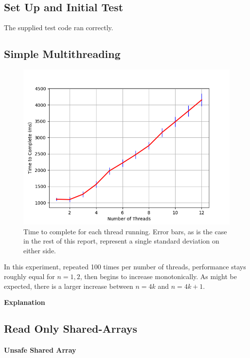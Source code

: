 \documentclass[11pt]{article}
\newcommand{\todo}[1]{\textbf{#1}}
\begin{document}
\subsection{Set Up and Initial Test}
The supplied test code ran correctly.
\subsection{Simple Multithreading}
\begin{figure}\label{step2_1}
\centering
\includegraphics[scale=0.65]{step2.png}
 \caption{Time to complete for each thread running. Error bars, as is the case in the rest of this report, represent a single standard deviation on either side.}
\end{figure}

In this experiment, repeated 100 times per number of threads, performance stays roughly equal for $n = 1, 2$, then begins to increase monotonically. As might be expected, there is a larger increase between $n= 4k$ and $n= 4k +1$.

\todo{Explanation}


\subsection{Read Only Shared-Arrays}
\paragraph{Unsafe Shared Array}
\end{document}
